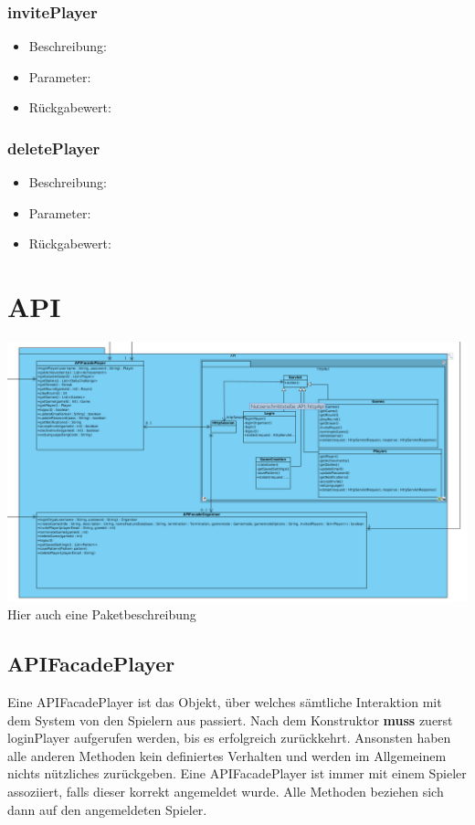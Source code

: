 \documentclass[a4paper]{scrreprt}
\begin{document}
		\subsubsection{invitePlayer}
		\begin{itemize}
			\item Beschreibung:
			\item Parameter:
			\item Rückgabewert:
		\end{itemize}
		\subsubsection{deletePlayer}
		\begin{itemize}
			\item Beschreibung:
			\item Parameter:
			\item Rückgabewert:
		\end{itemize}

	\section{API}
	\includegraphics[width=\textwidth]{img/api.png}
	Hier auch eine Paketbeschreibung \\
	\subsection{APIFacadePlayer}
	Eine APIFacadePlayer ist das Objekt, über welches sämtliche Interaktion mit dem System von den Spielern aus passiert. Nach dem Konstruktor \textbf{muss} zuerst loginPlayer aufgerufen werden, bis es erfolgreich zurückkehrt. Ansonsten haben alle anderen Methoden kein definiertes Verhalten und werden im Allgemeinem nichts nützliches zurückgeben. Eine APIFacadePlayer ist immer mit einem Spieler assoziiert, falls dieser korrekt angemeldet wurde. Alle Methoden beziehen sich dann auf den angemeldeten Spieler.
\end{document}
